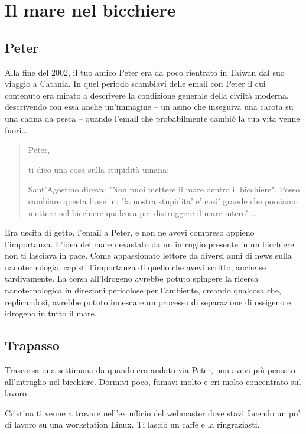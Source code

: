\chapter{Il mare nel bicchiere}
\label{il_mare_nel_bicchiere} %

\section{Peter}
\label{defs}

Alla fine del 2002, il tuo amico Peter era da poco rientrato in Taiwan dal suo viaggio a Catania. In quel periodo scambiavi delle email con Peter il cui contenuto era mirato a descrivere la condizione generale della civiltà moderna, descrivendo con essa anche un'immagine -- un asino che inseguiva una carota su una canna da pesca -- quando l'email che probabilmente cambiò la tua vita venne fuori\ldots

\begin{quote}
{\ttfamily\small
Peter,

ti dico una cosa sulla stupidità umana:

Sant'Agostino diceva: "Non puoi mettere il mare dentro il bicchiere". Posso cambiare questa frase in: "la nostra stupidita' e' cosi' grande che possiamo mettere nel bicchiere qualcosa per distruggere il mare intero" \ldots
}
\end{quote}

Era uscita di getto, l'email a Peter, e non ne avevi compreso appieno l'importanza. L'idea del mare devastato da un intruglio presente in un bicchiere non ti lasciava in pace. Come appassionato lettore da diversi anni di news sulla nanotecnologia, capisti l'importanza di quello che avevi scritto, anche se tardivamente. La corsa all'idrogeno avrebbe potuto spingere la ricerca nanotecnologica in direzioni pericolose per l'ambiente, creando qualcosa che, replicandosi, avrebbe potuto innescare un processo di separazione di ossigeno e idrogeno in tutto il mare.

\section{Trapasso}
\label{trapasso}

Trascorsa una settimana da quando era andato via Peter, non avevi più pensato all'intruglio nel bicchiere. Dormivi poco, fumavi molto e eri molto concentrato sul lavoro.

Cristina ti venne a trovare nell'ex ufficio del webmaster dove stavi facendo un po' di lavoro su una workstation Linux. Ti lasciò un caffé e la ringraziasti.

